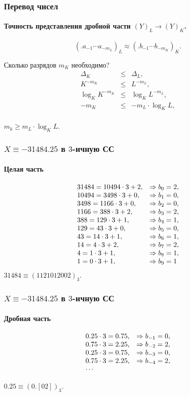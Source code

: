 \begin{frame}
    \frametitle{Перевод чисел}
    \framesubtitle{Точность представления дробной части $(Y)_L\to(Y)_K$.}
    
    \[(.a_{-1}\cdots a_{-m_L})_L\approx(.b_{-1}\cdots b_{-m_K})_K.\]
    
    Сколько разрядов $m_K$ необходимо?
    \[
        \begin{array}{ccc}
            \Delta_{K}      &\leq& \Delta_{L},\\
            K^{-m_K}        &\leq& L^{-m_L},\\
            \log_K K^{-m_K} &\leq& \log_K L^{-m_L},\\
            -m_K            &\leq& -m_L\cdot\log_K L,\\
        \end{array}
    \]
    
    \alert{$m_k \geq m_L\cdot\log_K L$}.
\end{frame}

\begin{frame}
    \frametitle{$X\equiv-31484.25$ в $3$-ичную СС}
    \framesubtitle{Целая часть}
    
    \[
        \begin{array}[c]{ll}
            31484=10494\cdot 3 + 2, &\Rightarrow b_{0}=2, \\
            10494=3498\cdot 3 + 0,  &\Rightarrow b_{1}=0, \\
            3498=1166\cdot 3 + 0,   &\Rightarrow b_{2}=0, \\
            1166=388\cdot 3 + 2,    &\Rightarrow b_{3}=2, \\
            388=129\cdot 3 + 1,     &\Rightarrow b_{4}=1, \\
            129=43\cdot 3 + 0,      &\Rightarrow b_{5}=0, \\
            43=14\cdot 3 + 1,       &\Rightarrow b_{6}=1, \\
            14=4\cdot 3 + 2,        &\Rightarrow b_{7}=2, \\
            4=1\cdot 3 + 1,         &\Rightarrow b_{8}=1, \\
            1=0\cdot 3 + 1,         &\Rightarrow b_{9}=1
        \end{array}
    \]
    $31484\equiv(1121012002)_3$.
\end{frame}

\begin{frame}
    \frametitle{$X\equiv-31484.25$ в $3$-ичную СС}
    \framesubtitle{Дробная часть}
    
    \[
        \begin{array}[c]{ll}
            0.25\cdot 3=0.75,   &\Rightarrow b_{-1}=0, \\
            0.75\cdot 3=2.25,   &\Rightarrow b_{-2}=2, \\
            0.25\cdot 3=0.75,   &\Rightarrow b_{-3}=0, \\
            0.75\cdot 3=2.25,   &\Rightarrow b_{-4}=2, \\
            \cdots
        \end{array}
    \]
    
    $0.25\equiv (0.[02])_3$.
\end{frame}    

